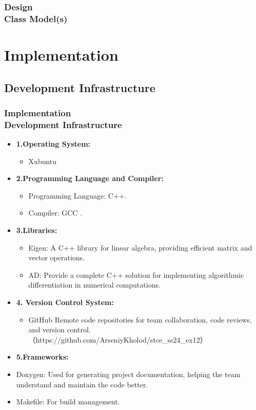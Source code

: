 \documentclass[ucs,10pt]{beamer}
\begin{document}
\begin{frame}
\frametitle{Design \\
	\small \color{rwth-blue} Class Model(s)}
\end{frame}





\section{Implementation}

\subsection{Development Infrastructure}

\begin{frame}
\frametitle{Implementation \\
	\small \color{rwth-blue} Development Infrastructure}
	\begin{itemize}	
            \item \textbf{1.Operating System:}
				\begin{itemize}
					\item Xubuntu
				\end{itemize}
            \item \textbf{2.Programming Language and Compiler:}
				\begin{itemize}
					\item Programming Language: C++.
					\item Compiler: GCC .
				\end{itemize}
			\item \textbf{3.Libraries:}
				\begin{itemize}
					\item Eigen: A C++ library for linear algebra, providing efficient matrix and vector operations.
					\item AD: Provide a complete C++ solution for implementing algorithmic differentiation in numerical computations. 
				\end{itemize}
			\item \textbf{4. Version Control System:}
				\begin{itemize}
				\item GitHub Remote code repositories for team collaboration, code reviews, and version control. （https://github.com/ArseniyKholod/stce_ss24_ex12）
				\end{itemize}
			\item \textbf{5.Frameworks:}
					\item Doxygen: Used for generating project documentation, helping the team understand and maintain the code better.
					\item Makefile: For build management.
	\end{itemize}
\end{frame}
\end{document}
